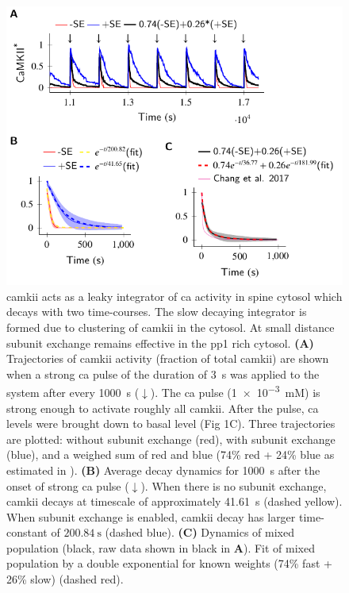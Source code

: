 \documentclass[9pt,lineno,doublespacing]{elife}
\begin{document}
\begin{figure}%
    \includegraphics[width=11.4cm]{PaperFigures/elifeFigure6/figure_two_timecourses_114cm.pdf}
    \caption{ \gls{camkii} acts as a leaky integrator of \gls{ca} activity in
        spine cytosol which decays with two time-courses. The slow decaying
        integrator is formed due to clustering of \gls{camkii} in the cytosol.
        At small distance subunit exchange remains effective in the \gls{pp1} rich cytosol.
        \textbf{(A)} Trajectories of \gls{camkii} activity (fraction of total \gls{camkii})
        are shown when a strong \gls{ca} pulse of the duration of \SI{3}{\second}
        was applied to the system after every \SI{1000}{\second} ($\downarrow$).
        The \gls{ca} pulse (\SI{1e-3}{mM}) is strong enough to activate roughly
        all \gls{camkii}. After the pulse, \gls{ca} levels were brought down to basal level (Fig
        1C). Three trajectories are plotted: without subunit exchange (red), with
        subunit exchange (blue), and a weighed sum of red and blue (74\%
        red + 24\% blue as estimated in \cite{chang_camkii_2017}). 
        \textbf{(B)} Average decay dynamics for \SI{1000}{\second} after the
        onset of strong \gls{ca} pulse ($\downarrow$).  When there is no subunit exchange, 
        \gls{camkii} decays at timescale of approximately \SI{41.61}{\second}
        (dashed yellow). When subunit exchange is enabled, \gls{camkii} decay has larger
        time-constant of $\SI{200.84}{\second}$ (dashed blue). 
        \textbf{(C)} Dynamics of mixed population (black, raw data shown in
        black in \textbf{A}). Fit of mixed population by a double
        exponential for known weights (74\% fast + 26\% slow) (dashed red).
}
\end{figure}
\end{document}
